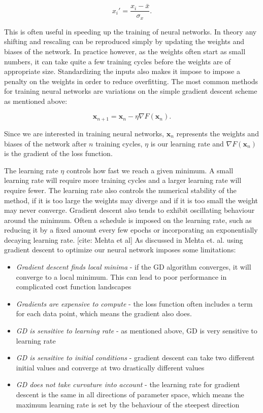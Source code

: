 $$ x_{i}' = \frac{x_{i} - \bar{x}}{\sigma_x} . $$

This is often useful in speeding up the training of neural networks.
In theory any shifting and rescaling can be reproduced simply
by updating the weights and biases of the network.
In practice however, as the weights often start as
small numbers, it can take quite a few training cycles before
the weights are of appropriate size.
Standardizing the inputs also makes it impose to
impose a penalty on the weights in order to reduce
overfitting.
\newline
\newline
The most common methods for training neural networks
are variations on the simple gradient descent scheme as mentioned
above:

$$ \bm{x}_{n+1} = \bm{x}_{n} - \eta \nabla F(\bm{x}_n) . $$

Since we are interested in training neural networks,
$\bm{x}_{n}$ represents the weights and biases of the network
after $n$ training cycles, $\eta$ is our learning rate
and $\nabla F(\bm{x}_n)$ is the gradient of the loss function.
\par
The learning rate $\eta$ controls how fast we reach a given minimum.
A small learning rate will require more training cycles
and a larger learning rate will require fewer.
The learning rate also controls the numerical stability
of the method, if it is too large the weights may diverge
and if it is too small the weight may never converge.
Gradient descent also tends to exhibit oscillating behaviour
around the minimum. Often a schedule is imposed
on the learning rate, such as reducing it by a fixed amount
every few epochs or incorporating an exponentially decaying learning rate.
[cite: Mehta et al]
As discussed in Mehta et. al. using gradient descent to optimize
our neural network imposes some limitations:

\begin{itemize}
    \item \textit{Gradient descent finds local minima} - 
        if the GD algorithm converges, it will converge to
        a local minimum. This can lead to poor performance
        in complicated cost function landscapes
    \item \textit{Gradients are expensive to compute} - 
        the loss function often includes a term for each
        data point, which means the gradient also does.
    \item \textit{GD is sensitive to learning rate} - 
        as mentioned above, GD is very sensitive to
        learning rate
    \item \textit{GD is sensitive to initial conditions} - 
        gradient descent can take two different initial values
        and converge at two drastically different values
    \item \textit{GD does not take curvature into account} - 
        the learning rate for gradient descent is the same
        in all directions of parameter space, which means
        the maximum learning rate is set by the behaviour of the
        steepest direction
\end{itemize}

